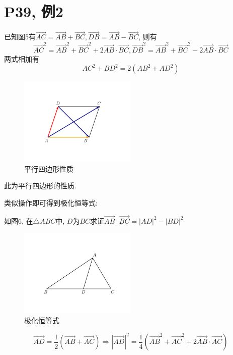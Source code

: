 \documentclass{book}
\begin{document}
        \section{\textcolor[rgb]{0.11,0.65,0.52}{P39, 例2}}
        已知图5有$\overrightarrow{AC}=\overrightarrow{AB}+\overrightarrow{BC},\overrightarrow{DB}=\overrightarrow{AB}-\overrightarrow{BC}$, 则有$$\overrightarrow{AC}^2=\overrightarrow{AB}^2+\overrightarrow{BC}^2+2\overrightarrow{AB}\cdot \overrightarrow{BC},\overrightarrow{DB}^2=\overrightarrow{AB}^2+\overrightarrow{BC}^2-2\overrightarrow{AB}\cdot \overrightarrow{BC}$$
        \textcolor[rgb]{0.75,0.17,0.22}{两式相加}有$$AC^2+BD^2=2(AB^2+AD^2)$$
        \begin{figure}[htbp]
            \centering
            \includegraphics[width=0.5\textwidth]{img/PolarizationIdentity.png}
            \caption{平行四边形性质}
        \end{figure}
        此为平行四边形的性质.

        类似操作即可得到\textcolor[rgb]{0.38,0.11,0.2}{极化恒等式}: 

        如图6, 在$\triangle ABC$中, $D$为$BC$求证$\overrightarrow{AB}\cdot \overrightarrow{BC}=|AD|^2-|BD|^2$
        \begin{figure}[htbp]
            \centering
            \includegraphics[width=0.5\textwidth]{img/PolarizationIdentity_p.png}
            \caption{极化恒等式}
        \end{figure}
        \begin{equation}
            \overrightarrow{AD}=\frac{1}{2} \left ( \overrightarrow{AB}+\overrightarrow{AC} \right )\Longrightarrow |\overrightarrow{AD}|^2=\frac{1}{4}\left ( \overrightarrow{AB}^2+\overrightarrow{AC}^2+2\overrightarrow{AB}\cdot \overrightarrow{AC} \right )
        \end{equation}
\end{document}
